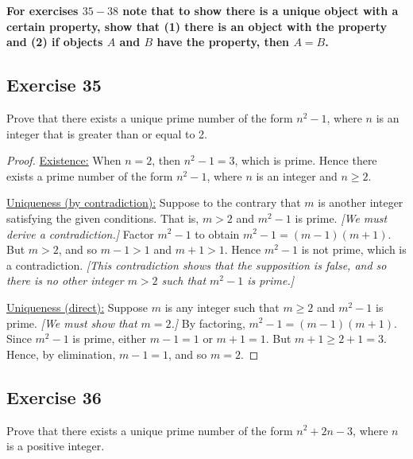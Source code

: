 \documentclass[14pt]{extarticle}
\newcommand{\cy}{\color{cyan}}
\begin{document}
{\bf \cy For exercises $35-38$ note that to show there is a unique object with a certain property, show that (1) there is an object with the property and (2) if objects $A$ and $B$ have the property, then $A = B$.}

\subsection{Exercise 35}
Prove that there exists a unique prime number of the form $n^2 - 1$, where $n$ is an integer that is greater than or equal to 2.

\begin{proof}
    \underline{Existence:} When $n = 2$, then $n^2 - 1 = 3$, which is prime. Hence there exists a prime number of the form $n^2 - 1$, where $n$ is an integer and $n \geq 2$.

    \underline{Uniqueness (by contradiction):} Suppose to the
    contrary that $m$ is another integer satisfying the given
    conditions. That is, $m > 2$ and $m^2 - 1$ is prime. {\it [We must derive a contradiction.]} Factor $m^2 - 1$ to obtain $m^2 - 1 = (m - 1)(m + 1)$. But $m > 2$, and so $m - 1 > 1$ and $m + 1 > 1$. Hence $m^2 - 1$ is not prime, which is a contradiction. {\it [This contradiction shows that the supposition is false, and so there is no other integer $m > 2$ such that $m^2 - 1$ is prime.]}

    \underline{Uniqueness (direct):} Suppose $m$ is any integer
    such that $m \geq 2$ and $m^2 - 1$ is prime. {\it [We must show that $m = 2$.]} By factoring, $m^2 - 1 = (m - 1)(m + 1)$. Since $m^2 - 1$ is prime, either $m - 1 = 1$ or $m + 1 = 1$. But $m + 1 \geq 2 + 1 = 3$. Hence, by elimination, $m - 1 = 1$, and so $m = 2$.
\end{proof}

\subsection{Exercise 36}
Prove that there exists a unique prime number of the form $n^2 + 2n - 3$, where $n$ is a positive integer.
\end{document}
